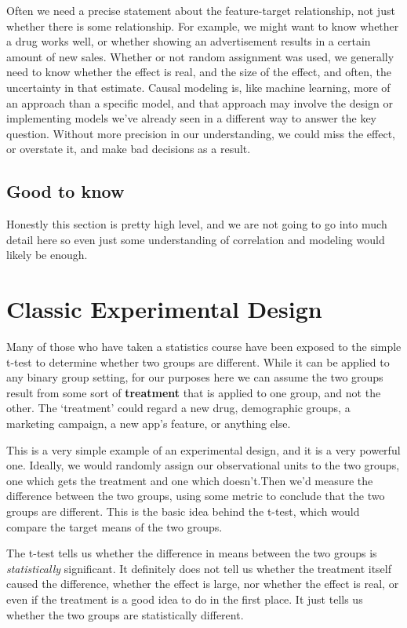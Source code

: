 \documentclass[
  letterpaper,
]{krantz}
\begin{document}
Often we need a precise statement about the feature-target relationship,
not just whether there is some relationship. For example, we might want
to know whether a drug works well, or whether showing an advertisement
results in a certain amount of new sales. Whether or not random
assignment was used, we generally need to know whether the effect is
real, and the size of the effect, and often, the uncertainty in that
estimate. Causal modeling is, like machine learning, more of an approach
than a specific model, and that approach may involve the design or
implementing models we've already seen in a different way to answer the
key question. Without more precision in our understanding, we could miss
the effect, or overstate it, and make bad decisions as a result.

\subsection{Good to know}\label{good-to-know-3}

Honestly this section is pretty high level, and we are not going to go
into much detail here so even just some understanding of correlation and
modeling would likely be enough.

\section{Classic Experimental Design}\label{classic-experimental-design}

Many of those who have taken a statistics course have been exposed to
the simple t-test to determine whether two groups are different. While
it can be applied to any binary group setting, for our purposes here we
can assume the two groups result from some sort of \textbf{treatment}
that is applied to one group, and not the other. The `treatment' could
regard a new drug, demographic groups, a marketing campaign, a new app's
feature, or anything else.

This is a very simple example of an experimental design, and it is a
very powerful one. Ideally, we would randomly assign our observational
units to the two groups, one which gets the treatment and one which
doesn't.Then we'd measure the difference between the two groups, using
some metric to conclude that the two groups are different. This is the
basic idea behind the t-test, which would compare the target means of
the two groups.

The t-test tells us whether the difference in means between the two
groups is \emph{statistically} significant. It definitely does not tell
us whether the treatment itself caused the difference, whether the
effect is large, nor whether the effect is real, or even if the
treatment is a good idea to do in the first place. It just tells us
whether the two groups are statistically different.
\end{document}
